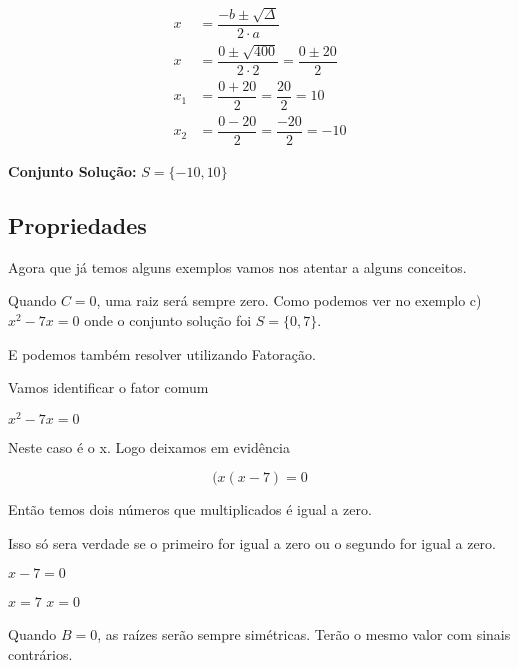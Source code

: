 \documentclass[letterpaper]{book}
\begin{document}
\begin{align*}
x &= \dfrac{-b \pm \sqrt{\Delta}}{2 \cdot a} \\
x &= \dfrac{0 \pm \sqrt{400}}{2 \cdot 2} = \dfrac{0 \pm20}{2} \\
x_1 &= \dfrac{0 + 20}{2} = \dfrac{20}{2} = 10 \\
x_2 &= \dfrac{0 - 20}{2} = \dfrac{-20}{2} = -10
\end{align*}

\begin{center}
\textbf{Conjunto Solução:} \(S = \{-10, 10\}\)
\end{center}

\subsection{Propriedades}

Agora que já temos alguns exemplos vamos nos atentar a alguns conceitos.

\vspace{0.5em}

Quando \(C = 0\), uma raiz será sempre zero. Como podemos ver no exemplo c) \(x^{2} -7x = 0\) onde o conjunto solução foi \(S = \{0, 7\}\).

\vspace{0.5em}

E podemos também resolver utilizando Fatoração.

\vspace{0.5em}

Vamos identificar o fator comum

\(x^{2} -7x = 0\)

\vspace{0.5em}

Neste caso é o x. Logo deixamos em evidência


\[(x(x - 7) = 0\]

Então temos dois números que multiplicados é igual a zero.


\vspace{0.5em}

Isso só sera verdade se o primeiro for igual a zero ou o segundo for igual a zero.

\(x - 7 = 0\)

\(x = 7\)
\(x = 0\)

Quando \(B = 0\), as raízes serão sempre simétricas. Terão o mesmo valor com sinais contrários.

\vspace{0.5em}
\end{document}
